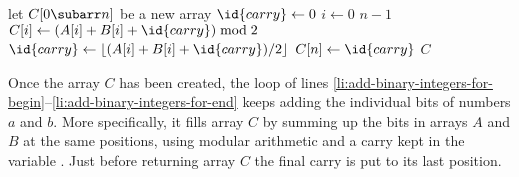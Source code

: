 \begin{codebox}
\li let $C[0\subarr n]$ be a new array
\li $\id{carry}\gets0$
\li \For $i\gets0$ \To $n-1$ \label{li:add-binary-integers-for-begin}
\li     \Do $C[i]\gets(A[i]+B[i]+\id{carry})\bmod2$
\li         $\id{carry}\gets\lfloor(A[i]+B[i]+\id{carry})/2\rfloor$
        \End \label{li:add-binary-integers-for-end}
\li $C[n]\gets\id{carry}$
\li \Return $C$
\end{codebox}

Once the array $C$ has been created, the  loop of lines \ref{li:add-binary-integers-for-begin}--\ref{li:add-binary-integers-for-end} keeps adding the individual bits of numbers $a$ and $b$.
More specifically, it fills array $C$ by summing up the bits in arrays $A$ and $B$ at the same positions, using modular arithmetic and a carry kept in the variable .
Just before returning array $C$ the final carry is put to its last position.
